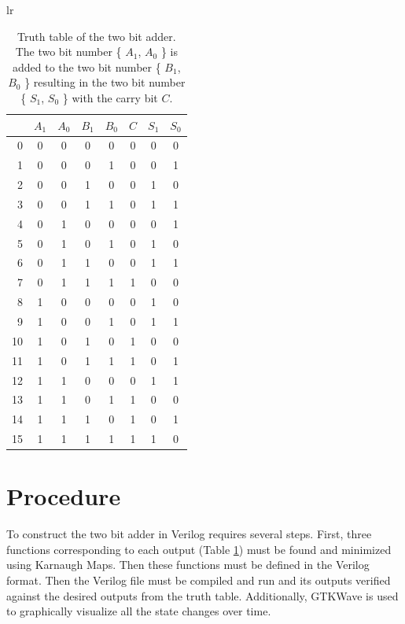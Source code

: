 \documentclass[12pt]{article}
\begin{document}
\begin{table}[hbp]
\begin{center}
\begin{tabular}{lr}
\begin{tabular}[t]{r|cccc|ccc}
 & $A_1$ & $A_0$ & $B_1$ & $B_0$ & $C$ & $S_1$ & $S_0$ \\
\hline
0  & 0 & 0 & 0 & 0 & 0 & 0 & 0\\
1  & 0 & 0 & 0 & 1 & 0 & 0 & 1\\
2  & 0 & 0 & 1 & 0 & 0 & 1 & 0\\
3  & 0 & 0 & 1 & 1 & 0 & 1 & 1\\
4  & 0 & 1 & 0 & 0 & 0 & 0 & 1\\
5  & 0 & 1 & 0 & 1 & 0 & 1 & 0\\
6  & 0 & 1 & 1 & 0 & 0 & 1 & 1\\
7  & 0 & 1 & 1 & 1 & 1 & 0 & 0\\
8  & 1 & 0 & 0 & 0 & 0 & 1 & 0\\
9  & 1 & 0 & 0 & 1 & 0 & 1 & 1\\
10 & 1 & 0 & 1 & 0 & 1 & 0 & 0\\
11 & 1 & 0 & 1 & 1 & 1 & 0 & 1\\
12 & 1 & 1 & 0 & 0 & 0 & 1 & 1\\
13 & 1 & 1 & 0 & 1 & 1 & 0 & 0\\
14 & 1 & 1 & 1 & 0 & 1 & 0 & 1\\
15 & 1 & 1 & 1 & 1 & 1 & 1 & 0\\
\end{tabular}
\end{tabular}
\end{center}
\caption{Truth table of the two bit adder.  The two bit number \{ $A_1$, $A_0$ \}
is added to the two bit number \{ $B_1$, $B_0$ \} resulting in the two bit number
\{ $S_1$, $S_0$ \} with the carry bit $C$.}
\label{tbl:tt}
\end{table}


\section{Procedure}
\label{sec:procedure}

To construct the two bit adder in Verilog requires several steps.
First, three functions corresponding to each output (Table \ref{tbl:tt})
must be found and minimized using Karnaugh Maps.
Then these functions must be defined in the Verilog format.
Then the Verilog file must be compiled and run and its outputs
verified against the desired outputs from the truth table.
Additionally, GTKWave is used to graphically visualize all the
state changes over time.
\end{document}
